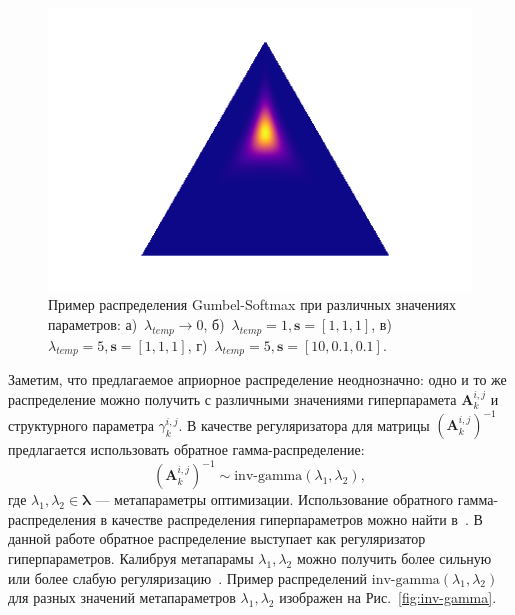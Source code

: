 \begin{figure}
\begin{minipage}[t]{.2\textwidth}
\subcaption{}
\end{minipage}
\hfill
 \begin{minipage}[t]{.2\textwidth}
   \includegraphics[width=\textwidth]{plots/notebooks/gs5_shift.png}
\subcaption{}
\end{minipage}

\caption{Пример распределения Gumbel-Softmax при различных значениях параметров: а)~$\lambda_{temp}\to0$, б)~$\lambda_{temp}=1, \mathbf{s}=[1,1,1]$, в)~$\lambda_{temp}=5, \mathbf{s}=[1,1,1]$, г)~$\lambda_{temp}=5, \mathbf{s}=[10,0.1,0.1].$}
\label{fig:gs}

\end{figure}


Заметим, что предлагаемое априорное распределение неоднозначно: одно и то же распределение  можно получить с различными значениями гиперпарамета $\mathbf{A}^{i,j}_k$ и структурного параметра $\gamma^{i,j}_k$. В качестве регуляризатора для матрицы $(\mathbf{A}^{i,j}_k)^{-1}$ предлагается использовать обратное гамма-распределение:
\[
    (\mathbf{A}^{i,j}_k)^{-1} \sim \text{inv-gamma}(\lambda_1,\lambda_2),
\]
где $\lambda_1,\lambda_2 \in \boldsymbol{\lambda}$ --- метапараметры оптимизации. 
Использование обратного гамма-распределения в качестве распределения гиперпараметров можно найти в~\cite{bishop,mackay}. В данной работе обратное распределение выступает как регуляризатор гиперпараметров.
Калибруя метапарамы   $\lambda_1,\lambda_2$ можно получить более сильную или более слабую регуляризацию~\cite{rvm}. Пример распределений $\text{inv-gamma}(\lambda_1,\lambda_2)$ для разных значений метапараметров $\lambda_1,\lambda_2$ изображен на Рис.~\ref{fig:inv-gamma}.

